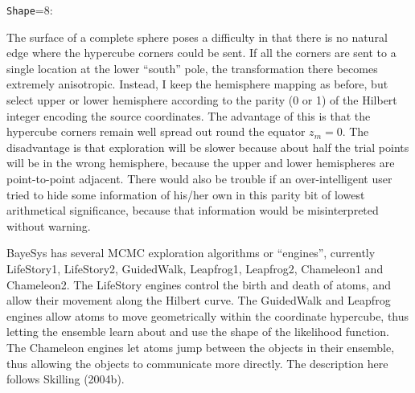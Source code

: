 \bigskip
{\tt Shape}=8: 

\noindent The surface of a complete sphere poses a difficulty in that there is no natural edge where the hypercube corners could be sent.
If all the corners are sent to a single location at the lower ``south'' pole, the transformation there becomes extremely anisotropic.
Instead, I keep the hemisphere mapping as before, 
but select upper or lower hemisphere according to the parity (0 or 1) of the Hilbert integer encoding the source coordinates.
The advantage of this is that the hypercube corners remain well spread out round the equator $z_m=0$.
The disadvantage is that exploration will be slower because about half the trial points will be in the wrong hemisphere,
because the upper and lower hemispheres are point-to-point adjacent.
There would also be trouble if an over-intelligent user tried to hide some information of his/her own in this parity bit of lowest arithmetical significance,
because that information would be misinterpreted without warning.

\vfill\eject
{}
\smallskip

BayeSys has several MCMC exploration algorithms or ``engines'', currently LifeStory1, LifeStory2, \hbox{GuidedWalk}, Leapfrog1, Leapfrog2, Chameleon1 and Chameleon2.
The LifeStory engines control the birth and death of atoms, and allow their movement along the Hilbert curve.
The GuidedWalk and Leapfrog engines allow atoms to move geometrically within the coordinate hypercube, 
thus letting the ensemble learn about and use the shape of the likelihood function.
The Chameleon engines let atoms jump between the objects in their ensemble, thus allowing the objects to communicate more directly.
The description here follows Skilling (2004b).

